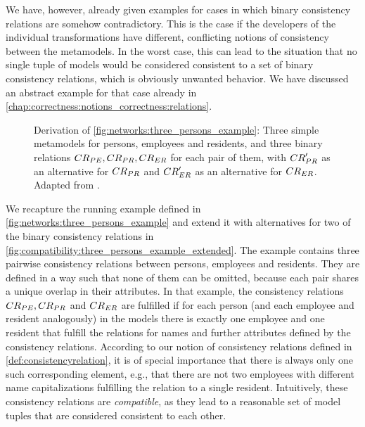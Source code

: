 We have, however, already given examples for cases in which binary consistency relations are somehow contradictory.
This is the case if the developers of the individual transformations have different, conflicting notions of consistency between the metamodels.
In the worst case, this can lead to the situation that no single tuple of models would be considered consistent to a set of binary consistency relations, which is obviously unwanted behavior.
We have discussed an abstract example for that case already in \autoref{chap:correctness:notions_correctness:relations}.

\begin{figure}
    \centering
    
    \caption[Three metamodels with (in)compatible consistency relations]{Derivation of \autoref{fig:networks:three_persons_example}: Three simple metamodels for persons, employees and residents, and three binary relations $\consistencyrelation{CR}{PE}, \consistencyrelation{CR}{PR}, \consistencyrelation{CR}{ER}$ for each pair of them, with $\consistencyrelation{CR}{PR}'$ as an alternative for $\consistencyrelation{CR}{PR}$ and $\consistencyrelation{CR}{ER}'$ as an alternative for $\consistencyrelation{CR}{ER}$. Adapted from .}
    \label{fig:compatibility:three_persons_example_extended}
\end{figure}

We recapture the running example defined in \autoref{fig:networks:three_persons_example} and extend it with alternatives for two of the binary consistency relations in \autoref{fig:compatibility:three_persons_example_extended}.
The example contains three pairwise consistency relations between persons, employees and residents.
They are defined in a way such that none of them can be omitted, because each pair shares a unique overlap in their attributes.
In that example, the consistency relations $\consistencyrelation{CR}{PE}, \consistencyrelation{CR}{PR}$ and $\consistencyrelation{CR}{ER}$ are fulfilled if for each person (and each employee and resident analogously) in the models there is exactly one employee and one resident that fulfill the relations for names and further attributes defined by the consistency relations.
According to our notion of consistency relations defined in \autoref{def:consistencyrelation}, it is of special importance that there is always only one such corresponding element, e.g., that there are not two employees with different name capitalizations fulfilling the relation to a single resident.
Intuitively, these consistency relations are \emph{compatible}, as they lead to a reasonable set of model tuples that are considered consistent to each other.

